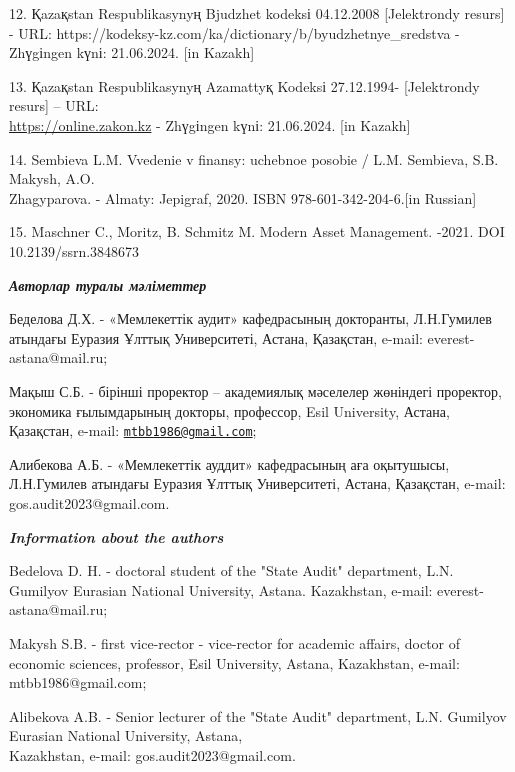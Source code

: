 \begin{references}
12. Қazaқstan Respublikasynyң Bjudzhet kodeksі 04.12.2008 {[}Jelektrondy
resurs{]} - URL:
https://kodeksy-kz.com/ka/dictionary/b/byudzhetnye\_sredstva - Zhүgіngen
kүnі: 21.06.2024. {[}in Kazakh{]}

13. Қazaқstan Respublikasynyң Azamattyқ Kodeksі 27.12.1994-
{[}Jelektrondy resurs{]} -- URL:\\
\href{https://online.zakon.kz/Document/?doc\_id=51006061}{https://online.zakon.kz}
- Zhүgіngen kүnі: 21.06.2024. {[}in Kazakh{]}

14. Sembieva L.M. Vvedenie v finansy: uchebnoe posobie / L.M. Sembieva,
S.B. Makysh, A.O. \\Zhagyparova. - Almaty: Jepigraf, 2020. ISBN
978-601-342-204-6.{[}in Russian{]}

15. Maschner C., Moritz, B. Schmitz M. Modern Asset Management. -2021.
DOI 10.2139/ssrn.3848673
\end{references}

\begin{authorinfo}
\emph{{\bfseries Авторлар туралы мәліметтер}}

Беделова Д.Х. - «Мемлекеттік аудит» кафедрасының докторанты, Л.Н.Гумилев
атындағы Еуразия Ұлттық Университеті, Астана, Қазақстан, e-mail:
everest-astana@mail.ru;

Мақыш С.Б. - бірінші проректор -- академиялық мәселелер жөніндегі
проректор, экономика ғылымдарының докторы, профессор, Esil University,
Астана, Қазақстан, e-mail:
\href{mailto:mtbb1986@gmail.com}{\nolinkurl{mtbb1986@gmail.com}};

Алибекова А.Б. - «Мемлекеттік ауддит» кафедрасының аға оқытушысы,
Л.Н.Гумилев атындағы Еуразия Ұлттық Университеті, Астана, Қазақстан,
e-mail: gos.audit2023@gmail.com.

\emph{{\bfseries Information about the authors}}

Bedelova D. H. - doctoral student of the "State Audit" department, L.N.
Gumilyov Eurasian National University, Astana. Kazakhstan, e-mail:
everest-astana@mail.ru;

Makysh S.B. - first vice-rector - vice-rector for academic affairs,
doctor of economic sciences, professor, Esil University, Astana,
Kazakhstan, e-mail: mtbb1986@gmail.com;

Alibekova A.B. - Senior lecturer of the "State Audit" department, L.N.
Gumilyov Eurasian National University, Astana, \\Kazakhstan, e-mail:
gos.audit2023@gmail.com.
\end{authorinfo}
